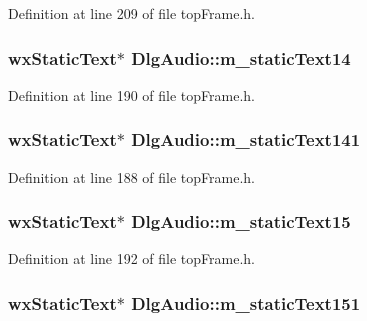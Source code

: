 Definition at line 209 of file top\-Frame.\-h.

\hypertarget{class_dlg_audio_adfd283017fa96c14f349368961bd4737}{
\subsubsection[{m\-\_\-static\-Text14}]{\setlength{\rightskip}{0pt plus 5cm}wx\-Static\-Text$\ast$ Dlg\-Audio\-::m\-\_\-static\-Text14\hspace{0.3cm}{\ttfamily [protected]}}}\label{class_dlg_audio_adfd283017fa96c14f349368961bd4737}


Definition at line 190 of file top\-Frame.\-h.

\hypertarget{class_dlg_audio_ac99a630f69e15e73d3942d0338ccae66}{
\subsubsection[{m\-\_\-static\-Text141}]{\setlength{\rightskip}{0pt plus 5cm}wx\-Static\-Text$\ast$ Dlg\-Audio\-::m\-\_\-static\-Text141\hspace{0.3cm}{\ttfamily [protected]}}}\label{class_dlg_audio_ac99a630f69e15e73d3942d0338ccae66}


Definition at line 188 of file top\-Frame.\-h.

\hypertarget{class_dlg_audio_adf762645da78b3948bc1fe8ba31b1444}{
\subsubsection[{m\-\_\-static\-Text15}]{\setlength{\rightskip}{0pt plus 5cm}wx\-Static\-Text$\ast$ Dlg\-Audio\-::m\-\_\-static\-Text15\hspace{0.3cm}{\ttfamily [protected]}}}\label{class_dlg_audio_adf762645da78b3948bc1fe8ba31b1444}


Definition at line 192 of file top\-Frame.\-h.

\hypertarget{class_dlg_audio_a6cdf994e898954407e2b064e3aa5b0b7}{
\subsubsection[{m\-\_\-static\-Text151}]{\setlength{\rightskip}{0pt plus 5cm}wx\-Static\-Text$\ast$ Dlg\-Audio\-::m\-\_\-static\-Text151\hspace{0.3cm}{\ttfamily [protected]}}}\label{class_dlg_audio_a6cdf994e898954407e2b064e3aa5b0b7}


